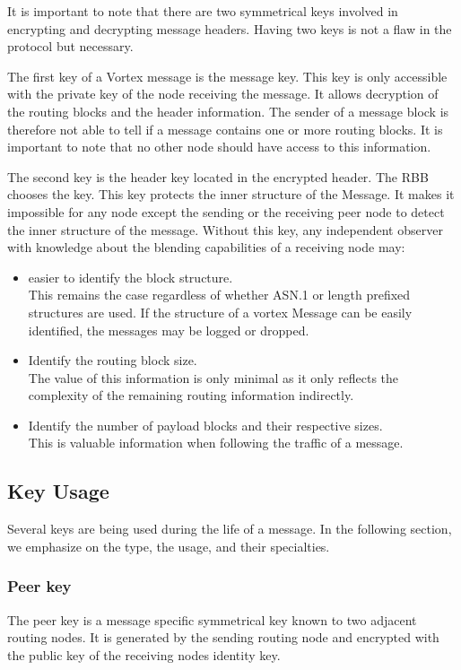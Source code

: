 It is important to note that there are two symmetrical keys involved in encrypting and decrypting message headers. Having two keys is not a flaw in the protocol but necessary. 

The first key of a Vortex message is the message key. This key is only accessible with the private key of the node receiving the message. It allows decryption of the routing blocks and the header information. The sender of a message block is therefore not able to tell if a message contains one or more routing blocks. It is important to note that no other node should have access to this information. 

The second key is the header key located in the encrypted header. The RBB chooses the key. This key protects the inner structure of the Message. It makes it impossible for any node except the sending or the receiving peer node to detect the inner structure of the message. Without this key, any independent observer with knowledge about the blending capabilities of a receiving node may:
\begin{itemize}
	\item easier to identify the block structure.\\ 
	This remains the case regardless of whether ASN.1 or length prefixed structures are used. If the structure of a vortex Message can be easily identified, the messages may be logged or dropped.
	\item Identify the routing block size.\\
	The value of this information is only minimal as it only reflects the complexity of the remaining routing information indirectly.
	\item Identify the number of payload blocks and their respective sizes. \\
	This is valuable information when following the traffic of a message.
\end{itemize}

\subsection{Key Usage}
Several keys are being used during the life of a message. In the following section, we emphasize on the type, the usage, and their specialties.

\subsubsection{Peer key}
The peer key is a message specific symmetrical key known to two adjacent routing nodes. It is generated by the sending routing node and encrypted with the public key of the receiving nodes identity key.

